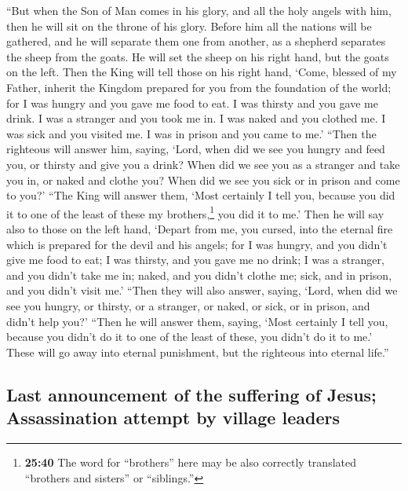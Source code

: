  ``But when the Son of Man comes in his glory, and all
the holy angels with him, then he will sit on the throne of his glory.
 Before him all the nations will be gathered, and he will
separate them one from another, as a shepherd separates the sheep from
the goats.  He will set the sheep on his right hand, but
the goats on the left.  Then the King will tell those on
his right hand, `Come, blessed of my Father, inherit the Kingdom
prepared for you from the foundation of the world;  for I
was hungry and you gave me food to eat. I was thirsty and you gave me
drink. I was a stranger and you took me in.  I was naked
and you clothed me. I was sick and you visited me. I was in prison and
you came to me.'  ``Then the righteous will answer him,
saying, `Lord, when did we see you hungry and feed you, or thirsty and
give you a drink?  When did we see you as a stranger and
take you in, or naked and clothe you?  When did we see
you sick or in prison and come to you?'  ``The King will
answer them, `Most certainly I tell you, because you did it to one of
the least of these my brothers,\footnote{\textbf{25:40} The word for
  ``brothers'' here may be also correctly translated ``brothers and
  sisters'' or ``siblings.''} you did it to me.'  Then he
will say also to those on the left hand, `Depart from me, you cursed,
into the eternal fire which is prepared for the devil and his angels;
 for I was hungry, and you didn't give me food to eat; I
was thirsty, and you gave me no drink;  I was a stranger,
and you didn't take me in; naked, and you didn't clothe me; sick, and in
prison, and you didn't visit me.'  ``Then they will also
answer, saying, `Lord, when did we see you hungry, or thirsty, or a
stranger, or naked, or sick, or in prison, and didn't help you?'
 ``Then he will answer them, saying, `Most certainly I
tell you, because you didn't do it to one of the least of these, you
didn't do it to me.'  These will go away into eternal
punishment, but the righteous into eternal life.''

\hypertarget{last-announcement-of-the-suffering-of-jesus-assassination-attempt-by-village-leaders}{%
\subsection{Last announcement of the suffering of Jesus; Assassination
attempt by village
leaders}\label{last-announcement-of-the-suffering-of-jesus-assassination-attempt-by-village-leaders}}

